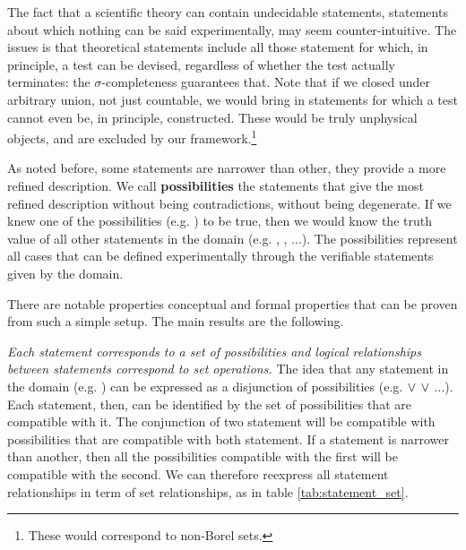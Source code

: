 \documentclass[twocolumn]{article}
\begin{document}
The fact that a scientific theory can contain undecidable statements, statements about which nothing can be said experimentally, may seem counter-intuitive. The issues is that theoretical statements include all those statement for which, in principle, a test can be devised, regardless of whether the test actually terminates: the $\sigma$-completeness guarantees that. Note that if we closed under arbitrary union, not just countable, we would bring in statements for which a test cannot even be, in principle, constructed. These would be truly unphysical objects, and are excluded by our framework.\footnote{These would correspond to non-Borel sets.}

As noted before, some statements are narrower than other, they provide a more refined description. We call \textbf{possibilities} the statements that give the most refined description without being contradictions, without being degenerate. If we knew one of the possibilities (e.g. ) to be true, then we would know the truth value of all other statements in the domain (e.g. , , ...). The possibilities represent all cases that can be defined experimentally through the verifiable statements given by the domain.

There are notable properties conceptual and formal properties that can be proven from such a simple setup. The main results are the following.

\textit{Each statement corresponds to a set of possibilities and logical relationships between statements correspond to set operations.} The idea that any statement in the domain (e.g. ) can be expressed as a disjunction of possibilities (e.g.  $\vee$  $\vee$ ...). Each statement, then, can be identified by the set of possibilities that are compatible with it. The conjunction of two statement will be compatible with possibilities that are compatible with both statement. If a statement is narrower than another, then all the possibilities compatible with the first will be compatible with the second. We can therefore reexpress all statement relationships in term of set relationships, as in table \ref{tab:statement_set}.
\end{document}
